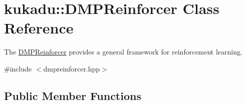 \hypertarget{classkukadu_1_1DMPReinforcer}{\section{kukadu\-:\-:D\-M\-P\-Reinforcer Class Reference}
\label{classkukadu_1_1DMPReinforcer}
}


The \hyperlink{classkukadu_1_1DMPReinforcer}{D\-M\-P\-Reinforcer} provides a general framework for reinforcement learning.  




{\ttfamily \#include $<$dmpreinforcer.\-hpp$>$}

\subsection*{Public Member Functions}
